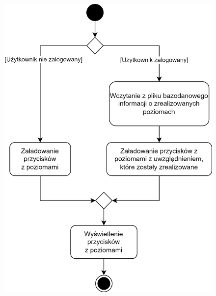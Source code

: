 \documentclass[12pt, a4paper]{article} %
\begin{document}
\begin{figure}[h]
	\centering
	\begin{minipage}{.5\textwidth}
	  \centering
	  \includegraphics[width=.8\textwidth]{images/diagramy_czynnosci/plan-diagram_czynnosc_wybor_poziomu.png}
	  \label{rys:diagram_czynnosc_wybor_poziomu}
	\end{minipage}%
	\begin{minipage}{.5\textwidth}
	  \centering

\end{minipage}
\end{figure}
\end{document}
